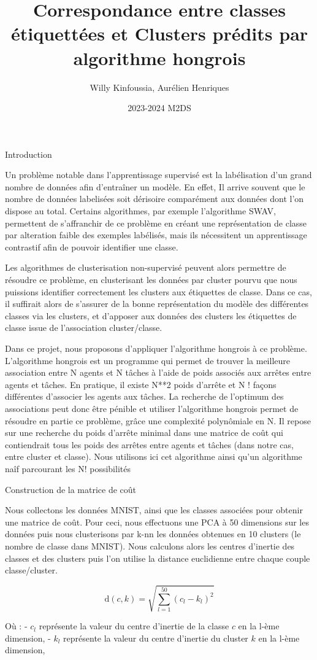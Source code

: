 \documentclass[
  ignorenonframetext,
]{beamer}
\title{Correspondance entre classes étiquettées et Clusters prédits par
algorithme hongrois}
\author{Willy Kinfoussia, Aurélien Henriques}
\date{2023-2024 M2DS}
\begin{document}
\frame{\titlepage}

\begin{frame}{}
\protect\hypertarget{section}{}
Introduction

Un problème notable dans l'apprentissage supervisé est la labélisation
d'un grand nombre de données afin d'entraîner un modèle. En effet, Il
arrive souvent que le nombre de données labelisées soit dérisoire
comparément aux données dont l'on dispose au total. Certains
algorithmes, par exemple l'algorithme SWAV, permettent de s'affranchir
de ce problème en créant une représentation de classe par alteration
faible des exemples labélisés, mais ils nécessitent un apprentissage
contrastif afin de pouvoir identifier une classe.

Les algorithmes de clusterisation non-supervisé peuvent alors permettre
de résoudre ce problème, en clusterisant les données par cluster pourvu
que nous puissions identifier correctement les clusters aux étiquettes
de classe. Dans ce cas, il suffirait alors de s'assurer de la bonne
représentation du modèle des différentes classes via les clusters, et
d'apposer aux données des clusters les étiquettes de classe issue de
l'association cluster/classe.
\end{frame}

\begin{frame}{}
\protect\hypertarget{section-1}{}
Dans ce projet, nous proposons d'appliquer l'algorithme hongrois à ce
problème. L'algorithme hongrois est un programme qui permet de trouver
la meilleure association entre N agents et N tâches à l'aide de poids
associés aux arrêtes entre agents et tâches. En pratique, il existe N**2
poids d'arrête et N ! façons différentes d'associer les agents aux
tâches. La recherche de l'optimum des associations peut donc être
pénible et utiliser l'algorithme hongrois permet de résoudre en partie
ce problème, grâce une complexité polynômiale en N. Il repose sur une
recherche du poids d'arrête minimal dans une matrice de coût qui
contiendrait tous les poids des arrêtes entre agents et tâches (dans
notre cas, entre cluster et classe). Nous utilisons ici cet algorithme
ainsi qu'un algorithme naîf parcourant les N! possibilités
\end{frame}

\begin{frame}{}
\protect\hypertarget{section-2}{}
Construction de la matrice de coût

Nous collectons les données MNIST, ainsi que les classes associées pour
obtenir une matrice de coût. Pour ceci, nous effectuons une PCA à 50
dimensions sur les données puis nous clusterisons par k-nn les données
obtenues en 10 clusters (le nombre de classe dans MNIST). Nous calculons
alors les centres d'inertie des classes et des clusters puis l'on
utilise la distance euclidienne entre chaque couple classe/cluster.

\[
\text{d}(c, k) = \sqrt{\sum_{l=1}^{50} (c_{l} - k_{l})^2}
\]

Où : - \(c_l\) représente la valeur du centre d'inertie de la classe
\(c\) en la l-ème dimension, - \(k_l\) représente la valeur du centre
d'inertie du cluster \(k\) en la l-ème dimension,
\end{frame}
\end{document}
